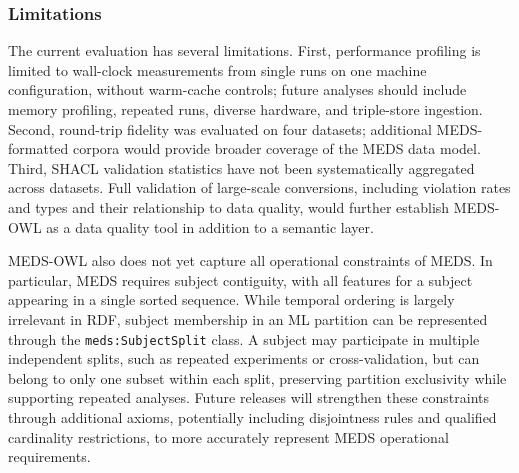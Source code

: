 
\subsubsection{Limitations}
The current evaluation has several limitations. First, performance profiling is limited to wall-clock measurements from single runs on one machine configuration, without warm-cache controls; future analyses should include memory profiling, repeated runs, diverse hardware, and triple-store ingestion. Second, round-trip fidelity was evaluated on four datasets; additional MEDS-formatted corpora would provide broader coverage of the MEDS data model. Third, SHACL validation statistics have not been systematically aggregated across datasets. Full validation of large-scale conversions, including violation rates and types and their relationship to data quality, would further establish MEDS-OWL as a data quality tool in addition to a semantic layer.

MEDS-OWL also does not yet capture all operational constraints of MEDS. In particular, MEDS requires subject contiguity, with all features for a subject appearing in a single sorted sequence. While temporal ordering is largely irrelevant in RDF, subject membership in an ML partition can be represented through the \texttt{meds:SubjectSplit} class. A subject may participate in multiple independent splits, such as repeated experiments or cross-validation, but can belong to only one subset within each split, preserving partition exclusivity while supporting repeated analyses. Future releases will strengthen these constraints through additional axioms, potentially including disjointness rules and qualified cardinality restrictions, to more accurately represent MEDS operational requirements.

